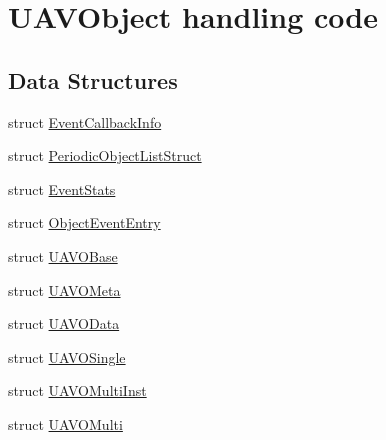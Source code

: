\hypertarget{group___u_a_v_object_handling}{\section{\-U\-A\-V\-Object handling code}
\label{group___u_a_v_object_handling}
}
\subsection*{\-Data \-Structures}
\begin{DoxyCompactItemize}
\item 
struct \hyperlink{struct_event_callback_info}{\-Event\-Callback\-Info}
\item 
struct \hyperlink{struct_periodic_object_list_struct}{\-Periodic\-Object\-List\-Struct}
\item 
struct \hyperlink{struct_event_stats}{\-Event\-Stats}
\item 
struct \hyperlink{struct_object_event_entry}{\-Object\-Event\-Entry}
\item 
struct \hyperlink{struct_u_a_v_o_base}{\-U\-A\-V\-O\-Base}
\item 
struct \hyperlink{struct_u_a_v_o_meta}{\-U\-A\-V\-O\-Meta}
\item 
struct \hyperlink{struct_u_a_v_o_data}{\-U\-A\-V\-O\-Data}
\item 
struct \hyperlink{struct_u_a_v_o_single}{\-U\-A\-V\-O\-Single}
\item 
struct \hyperlink{struct_u_a_v_o_multi_inst}{\-U\-A\-V\-O\-Multi\-Inst}
\item 
struct \hyperlink{struct_u_a_v_o_multi}{\-U\-A\-V\-O\-Multi}
\end{DoxyCompactItemize}
